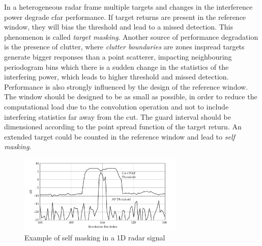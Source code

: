 In a heterogeneous radar frame multiple targets and changes in the interference power degrade \gls{cfar} performance. If target returns are present in the reference window, they will bias the threshold and lead to a missed detection. This phenomenon is called \textit{target masking}. Another source of performance degradation is the presence of clutter, where \textit{clutter boundaries} are zones inspread targets generate
bigger responses than a point scatterer, impacting
neighbouring periodogram bins which there is a sudden change in the statistics of the interfering power, which leads to higher threshold and missed detection.
Performance is also strongly influenced by the design of the reference window. The window should be designed to be as small as possible, in order to reduce the computational load due to the convolution operation and not to include interfering statistics far away from the \gls{cut}. The guard interval should be dimensioned according to the point spread function of the target return. An extended target could be counted in the reference window and lead to \textit{self masking}.

	\begin{figure}[H]
		\centering
		\includegraphics[width=0.7\textwidth]{Images/radar_detect_threshold/self_masking_Richards2010.png}
		\caption{Example of self masking in a 1D radar signal \cite{Richards_Scheer_Holm_2010}}
		\label{fig:self_masking_Richards2010}
	\end{figure}

